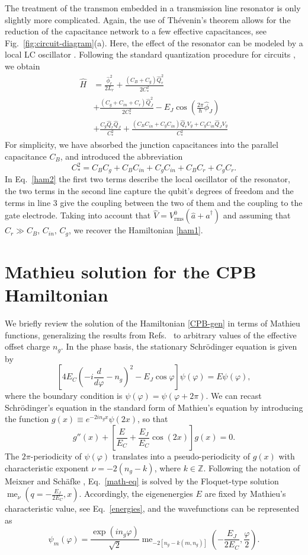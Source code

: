 \documentclass[twocolumn,amsmath,amssymb,floatfix,pra,showpacs,eqsecnum,footinbib,superscriptaddress]{revtex4}
\newcounter{fig}
\newcommand{\ZZ}{\mathbb{Z}}
\newcommand{\be}{\begin{equation}}
\newcommand{\ee}{\end{equation}}
\DeclareMathOperator{\me}{me}
\begin{document}
The treatment of the transmon embedded in a transmission line resonator is only slightly more complicated. Again, the use of Th\'{e}venin's theorem allows for the reduction of the capacitance network to a few effective capacitances, see Fig.~\ref{fig:circuit-diagram}(a). Here, the effect of the resonator can be modeled by a local LC oscillator \cite{blais1}. Following the standard quantization procedure for circuits \cite{devoret2}, we obtain
\begin{align}\label{ham2}
\hat{H}&=\frac{\hat{\phi}_r^2}{2L_r} + \frac{(C_B+C_g)\hat{Q}_r^2}{2C_*^2}\\\nonumber
&+\frac{(C_g+C_{in}+C_r)\hat{Q}_J^2}{2C_*^2}-E_J\cos\left(\frac{2\pi}{\hbar} \hat{\phi}_J\right)\\\nonumber
&+\frac{C_g\hat{Q}_r\hat{Q}_J}{C_*^2}+\frac{(C_BC_{in}+C_gC_{in})\hat{Q}_rV_g + C_gC_{in}\hat{Q}_JV_g}{C_*^2}
\end{align}
For simplicity, we have absorbed the junction capacitances into the parallel capacitance $C_B$, and introduced the abbreviation 
\[
C_*^2=C_BC_g + C_BC_{in}+ C_gC_{in}+C_BC_r+C_gC_r.
\]
In Eq.~\eqref{ham2} the first two terms describe the local oscillator of the resonator, the two terms in the second line capture the qubit's degrees of freedom and the terms in line 3 give the coupling between the two of them and the coupling to the gate electrode. Taking into account that $\hat{V}=V^0_\text{rms}(\hat{a}+\hat{a}^\dag)$ and assuming that $C_r\gg C_B,\,C_{in},\,C_g$, we recover the Hamiltonian \eqref{ham1}.

\section{Mathieu solution for the CPB Hamiltonian\label{app:mathieu}}
We briefly review the solution of the Hamiltonian \eqref{CPB-gen} in terms of Mathieu functions, generalizing the results from Refs.~\cite{cottet, devoret1} to arbitrary values of the effective offset charge $n_g$. In the phase basis, the stationary Schr{\"o}dinger equation is given by
\be\label{phase_ham}
\left[ 4E_C\left(-i\frac{d}{d\varphi}-n_g\right)^2 -E_J\cos \varphi\right]\psi(\varphi)=E\psi(\varphi),
\ee
where the boundary condition is $\psi(\varphi)=\psi(\varphi+2\pi)$. We can recast Schr{\"o}dinger's equation in the standard form of Mathieu's equation by introducing the function $g(x)\equiv e^{-2in_g x}\psi(2x)$, so that
\be\label{math-eq}
g''(x) + \left[\frac{E}{E_C}+\frac{E_J}{E_C}\cos(2x)\right]g(x)=0.
\ee
The $2\pi$-periodicity of $\psi(\varphi)$ translates into a pseudo-periodicity of $g(x)$ with characteristic exponent $\nu=-2(n_g-k)$, where $k\in\ZZ$. Following the notation of Meixner and Sch\"afke \cite{meixner2}, Eq.~\eqref{math-eq} is solved by the Floquet-type solution $\me_\nu(q=-\frac{E_J}{2E_C},x)$. Accordingly, the eigenenergies $E$ are fixed by Mathieu's characteristic value, see Eq.~\eqref{energies}, and the wavefunctions can be represented as
\be
\psi_m(\varphi)=\frac{\exp (in_g \varphi)}{\sqrt{2}}\me_{-2[n_g-k(m,n_g)]}\left(-\frac{E_J}{2E_C},\frac{\varphi}{2}\right).
\ee
\end{document}

